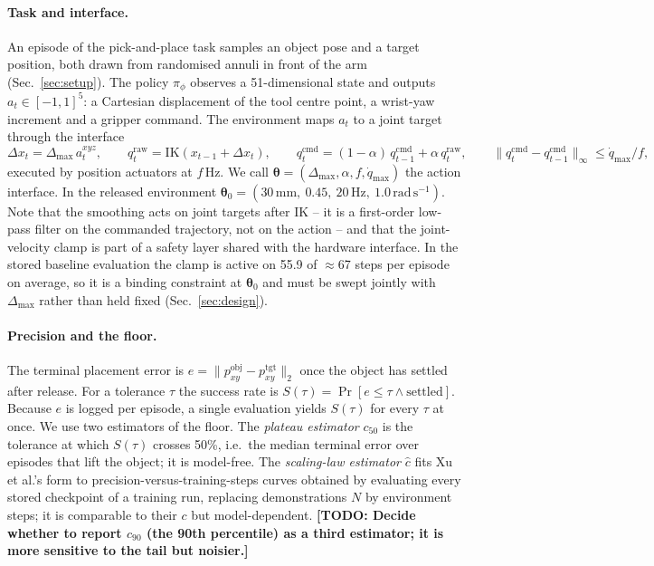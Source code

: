 \documentclass{article}
\newcommand{\todo}[1]{{\color{red}\textbf{[TODO: #1]}}}
\newcommand{\dmax}{\Delta_{\max}}
\newcommand{\qdmax}{\dot q_{\max}}
\newcommand{\iface}{\boldsymbol{\theta}}
\begin{document}
\paragraph{Task and interface.}
An episode of the pick-and-place task samples an object pose and a target position, both drawn from randomised annuli in front of the arm (Sec.~\ref{sec:setup}). The policy $\pi_\phi$ observes a 51-dimensional state and outputs $a_t \in [-1,1]^5$: a Cartesian displacement of the tool centre point, a wrist-yaw increment and a gripper command. The environment maps $a_t$ to a joint target through the interface
\begin{equation}
  \Delta x_t = \dmax\, a_t^{xyz},\qquad
  q^{\mathrm{raw}}_t = \mathrm{IK}(x_{t-1} + \Delta x_t),\qquad
  q^{\mathrm{cmd}}_t = (1-\alpha)\, q^{\mathrm{cmd}}_{t-1} + \alpha\, q^{\mathrm{raw}}_t,\qquad
  \|q^{\mathrm{cmd}}_t - q^{\mathrm{cmd}}_{t-1}\|_\infty \le \qdmax / f,
  \label{eq:interface}
\end{equation}
executed by position actuators at $f$\,Hz. We call $\iface = (\dmax,\alpha,f,\qdmax)$ the action interface. In the released environment $\iface_0 = (30\,\mathrm{mm},\ 0.45,\ 20\,\mathrm{Hz},\ 1.0\,\mathrm{rad\,s^{-1}})$. Note that the smoothing acts on joint targets after IK -- it is a first-order low-pass filter on the commanded trajectory, not on the action -- and that the joint-velocity clamp is part of a safety layer shared with the hardware interface. In the stored baseline evaluation the clamp is active on 55.9 of $\approx$67 steps per episode on average, so it is a binding constraint at $\iface_0$ and must be swept jointly with $\dmax$ rather than held fixed (Sec.~\ref{sec:design}).

\paragraph{Precision and the floor.}
The terminal placement error is $e = \|p^{\mathrm{obj}}_{xy} - p^{\mathrm{tgt}}_{xy}\|_2$ once the object has settled after release. For a tolerance $\tau$ the success rate is $S(\tau) = \Pr[e \le \tau \wedge \text{settled}]$. Because $e$ is logged per episode, a single evaluation yields $S(\tau)$ for every $\tau$ at once. We use two estimators of the floor. The \emph{plateau estimator} $c_{50}$ is the tolerance at which $S(\tau)$ crosses 50\%, i.e.\ the median terminal error over episodes that lift the object; it is model-free. The \emph{scaling-law estimator} $\hat c$ fits Xu et al.'s form to precision-versus-training-steps curves obtained by evaluating every stored checkpoint of a training run, replacing demonstrations $N$ by environment steps; it is comparable to their $c$ but model-dependent. \todo{Decide whether to report $c_{90}$ (the 90th percentile) as a third estimator; it is more sensitive to the tail but noisier.}
\end{document}
